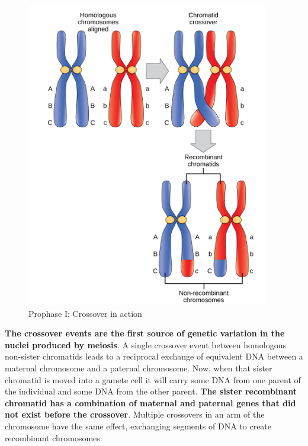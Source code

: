 \documentclass[12pt]{article}
\begin{document}
\begin{enumerate}
\begin{figure}[h!]
    \centering
    \includegraphics[scale=0.4]{crossover-in-action.png}
    \caption{Prophase I: Crossover in action}
    \label{fig: crossover-in-action}
\end{figure}
        \textbf{The crossover events are the first source of genetic variation in the nuclei produced by meiosis}. A single crossover event between homologous non-sister chromatids leads to a reciprocal exchange of equivalent DNA between a maternal chromosome and a paternal chromosome. Now, when that sister chromatid is moved into a gamete cell it will carry some DNA from one parent of the individual and some DNA from the other parent. \textbf{The sister recombinant chromatid has a combination of maternal and paternal genes that did not exist before the crossover}. Multiple crossovers in an arm of the chromosome have the same effect, exchanging segments of DNA to create recombinant chromosomes.


\end{enumerate}
\end{document}
